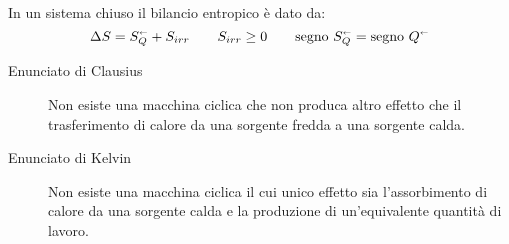 In un sistema chiuso il bilancio entropico è dato da:
\[
    \Delta S = S_Q^\shortleftarrow + S_{irr} \qquad S_{irr} \ge 0 \qquad \text{segno}~S_Q^\shortleftarrow = \text{segno}~Q^\shortleftarrow
\]

\begin{description}
    \item[Enunciato di Clausius]Non esiste una macchina ciclica che non produca altro effetto che il trasferimento di calore da una sorgente fredda a una sorgente calda.

\item[Enunciato di Kelvin]
Non esiste una macchina ciclica il cui unico effetto sia l'assorbimento di calore da una sorgente calda e la produzione di un'equivalente quantità di lavoro.
\end{description}
